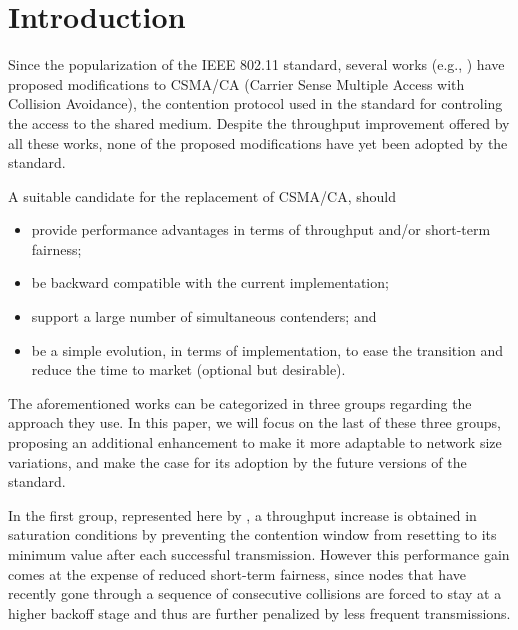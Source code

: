 \documentclass[conference]{IEEEtran}
\begin{document}
%
\IEEEpeerreviewmaketitle



\section{Introduction}

Since the popularization of the IEEE 802.11 standard, several works (e.g.,  \cite{bharghavan1994map,wang2004ncr,cali2000dti,lopez-toledo2006aoi,
barcelo2008lba,bellalta2009vtc,he2009srb,barcelo2010fcc,fang2011dlm,hui2011epp,barcelo2011tcf}) have proposed modifications to CSMA/CA (Carrier Sense Multiple Access with Collision Avoidance), the contention protocol used in the standard for controling the access to the shared medium. {Despite the throughput improvement offered by all these works, none of the proposed modifications have yet been adopted by the standard.}

A suitable candidate for the replacement of CSMA/CA, should
\begin{itemize}
  \item provide performance advantages in terms of throughput and/or short-term fairness;
  \item be backward compatible with the current implementation;
  \item support a large number of simultaneous contenders; and 
  \item be a simple evolution, in terms of implementation, to ease the transition and reduce the time to market (optional but desirable).
\end{itemize}

The aforementioned works can be categorized in three groups regarding the approach they use. {In this paper, we will focus on the last of these three groups, proposing an additional enhancement to make it more adaptable to network size variations, and make the case for its adoption by the future versions of the standard.}

In the first group, represented here by \cite{bharghavan1994map,wang2004ncr}, a throughput increase is obtained in saturation conditions by preventing the contention window from resetting to its minimum value after each successful transmission. However this performance gain comes at the expense of reduced short-term fairness, since nodes that have recently gone through a sequence of consecutive collisions are forced to stay at a higher backoff stage and thus are further penalized by less frequent transmissions.
\end{document}
